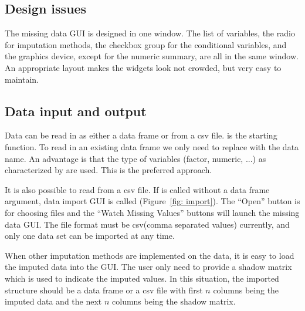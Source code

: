 \documentclass[article]{jss}
\begin{document}
\subsection{Design issues}

The missing data GUI is designed in one window. The list of variables, the radio for imputation methods, the checkbox group for the conditional variables, and the graphics device, except for the numeric summary, are all in the same window. An appropriate layout makes the widgets look not crowded, but very easy to maintain. 


\subsection{Data input and output}

Data can be read in as either a data frame or from a csv file.  is the starting function. To read in an existing data frame we only need to replace  with the data name. An advantage is that the type of variables (factor, numeric, ...) as characterized by  are used. This is the preferred approach.

It is also possible to read from a csv file.  If  is called without a data frame argument, data import GUI is called (Figure~\ref{fig: import}).  The ``Open'' button is for choosing files and the ``Watch Missing Values'' buttons will launch the missing data GUI. The file format must be csv(comma separated values) currently, and only one data set can be imported at any time.

When other imputation methods are implemented on the data, it is easy to load the imputed data into the GUI. The user only need to provide a shadow matrix which is used to indicate the imputed values. In this situation, the imported structure should be a data frame or a csv file with first $n$ columns being the imputed data and the next $n$ columns being the shadow matrix.
\end{document}
